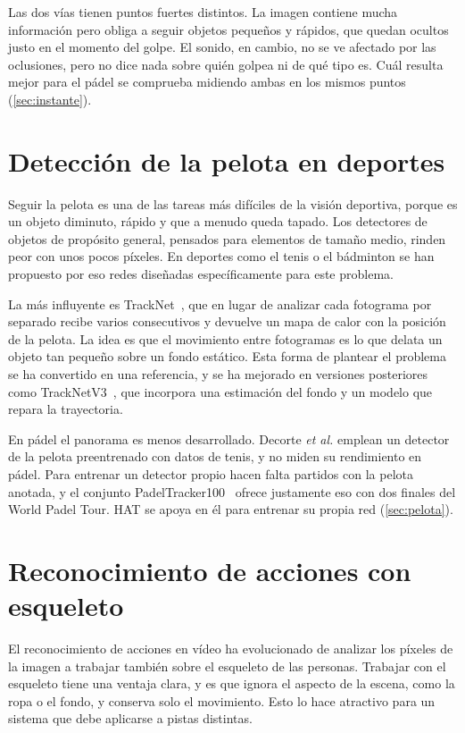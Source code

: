 Las dos vías tienen puntos fuertes distintos.
La imagen contiene mucha información pero obliga a seguir objetos pequeños y rápidos, que quedan ocultos justo en el momento del golpe.
El sonido, en cambio, no se ve afectado por las oclusiones, pero no dice nada sobre quién golpea ni de qué tipo es.
Cuál resulta mejor para el pádel se comprueba midiendo ambas en los mismos puntos (\cref{sec:instante}).

\section{Detección de la pelota en deportes}
\label{sec:arte-pelota}

Seguir la pelota es una de las tareas más difíciles de la visión deportiva, porque es un objeto diminuto, rápido y que a menudo queda tapado.
Los detectores de objetos de propósito general, pensados para elementos de tamaño medio, rinden peor con unos pocos píxeles.
En deportes como el tenis o el bádminton se han propuesto por eso redes diseñadas específicamente para este problema.

La más influyente es TrackNet~\cite{huang2019tracknet}, que en lugar de analizar cada fotograma por separado recibe varios consecutivos y devuelve un mapa de calor con la posición de la pelota.
La idea es que el movimiento entre fotogramas es lo que delata un objeto tan pequeño sobre un fondo estático.
Esta forma de plantear el problema se ha convertido en una referencia, y se ha mejorado en versiones posteriores como TrackNetV3~\cite{chen2023tracknetv3}, que incorpora una estimación del fondo y un modelo que repara la trayectoria.

En pádel el panorama es menos desarrollado.
Decorte \textit{et al.} emplean un detector de la pelota preentrenado con datos de tenis, y no miden su rendimiento en pádel.
Para entrenar un detector propio hacen falta partidos con la pelota anotada, y el conjunto PadelTracker100~\cite{badanerin2026padeltracker100} ofrece justamente eso con dos finales del World Padel Tour.
HAT se apoya en él para entrenar su propia red (\cref{sec:pelota}).

\section{Reconocimiento de acciones con esqueleto}
\label{sec:arte-esqueleto}

El reconocimiento de acciones en vídeo ha evolucionado de analizar los píxeles de la imagen a trabajar también sobre el esqueleto de las personas.
Trabajar con el esqueleto tiene una ventaja clara, y es que ignora el aspecto de la escena, como la ropa o el fondo, y conserva solo el movimiento.
Esto lo hace atractivo para un sistema que debe aplicarse a pistas distintas.

